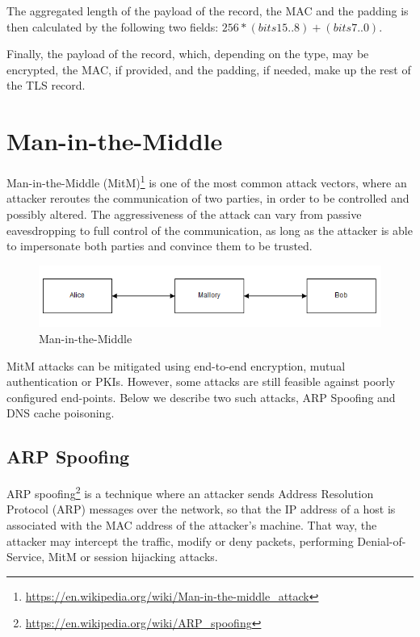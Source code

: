 The aggregated length of the payload of the record, the MAC and the padding is
then calculated by the following two fields: \begin{math}256*(bits 15..8) +
(bits 7..0)\end{math}.

Finally, the payload of the record, which, depending on the type, may be
encrypted, the MAC, if provided, and the padding, if needed, make up the rest of
the TLS record.

\section{Man-in-the-Middle}\label{sec:mitm}

Man-in-the-Middle
(MitM)\footnote{\url{https://en.wikipedia.org/wiki/Man-in-the-middle_attack}} is
one of the most common attack vectors, where an attacker reroutes the
communication of two parties, in order to be controlled and possibly altered.
The aggressiveness of the attack can vary from passive eavesdropping to full
control of the communication, as long as the attacker is able to impersonate
both parties and convince them to be trusted.

\begin{figure}[H] \caption{Man-in-the-Middle} \centering
\includegraphics[width=1\textwidth]{diagrams/mitm.png}\end{figure}

MitM attacks can be mitigated using end-to-end encryption, mutual authentication
or PKIs. However, some attacks are still feasible against poorly configured
end-points. Below we describe two such attacks, ARP Spoofing and DNS cache
poisoning.

\subsection{ARP Spoofing}

ARP spoofing\footnote{\url{https://en.wikipedia.org/wiki/ARP_spoofing}} is a
technique where an attacker sends Address Resolution Protocol (ARP) messages
over the network, so that the IP address of a host is associated with the MAC
address of the attacker's machine. That way, the attacker may intercept the
traffic, modify or deny packets, performing Denial-of-Service, MitM or session
hijacking attacks.

